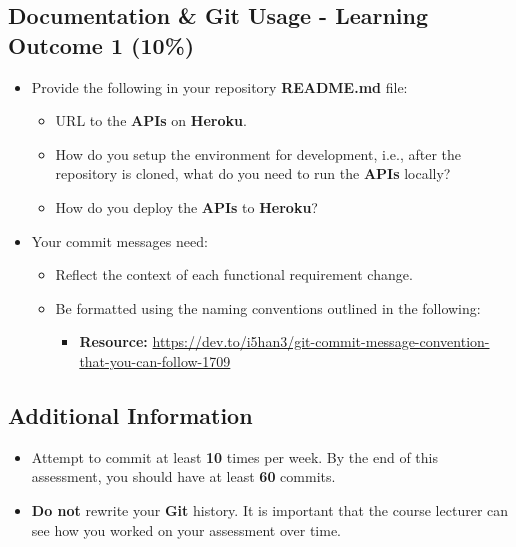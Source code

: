 \documentclass{article}
\begin{document}
\subsection*{Documentation \& Git Usage - Learning Outcome 1 (10\%)}
\begin{itemize}
    \item Provide the following in your repository \textbf{README.md} file:
    \begin{itemize}
        \item URL to the \textbf{APIs} on \textbf{Heroku}.
        \item How do you setup the environment for development, i.e., after the repository is cloned, what do you need to run the \textbf{APIs} locally?
        \item How do you deploy the \textbf{APIs} to \textbf{Heroku}?
    \end{itemize}
    \item Your commit messages need:
    \begin{itemize}
      \item Reflect the context of each functional requirement change. 
      \item Be formatted using the naming conventions outlined in the following:
      \begin{itemize}
        \item \textbf{Resource:} \small\href{https://dev.to/i5han3/git-commit-message-convention-that-you-can-follow-1709}{https://dev.to/i5han3/git-commit-message-convention-that-you-can-follow-1709}
      \end{itemize} 
    \end{itemize}
  \end{itemize}
  
  \subsection*{Additional Information}
  \begin{itemize}
    \item Attempt to commit at least \textbf{10} times per week. By the end of this assessment, you should have at least \textbf{60} commits.
    \item \textbf{Do not} rewrite your \textbf{Git} history. It is important that the course lecturer can see how you worked on your assessment over time. 
  \end{itemize}
\end{document}

